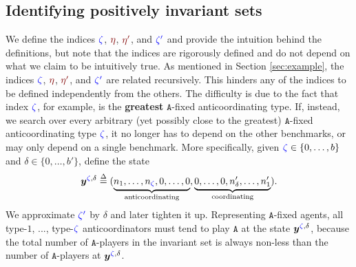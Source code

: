 \documentclass[10 pt,twocolumn,journal]{IEEEtran}
\theoremstyle{plain}
\newcommand{\db}{\overset{\Delta}{=}}
\newcommand{\A}{\mathcal{A}}
\renewcommand{\O}{\mathcal{O}}
\newcommand{\I}{\mathcal{I}}
\newcommand{\y}{\bm{y}}
\renewcommand{\r}{\tb{\zeta}}
\newcommand{\rr}{\tb{\zeta'}}
\newcommand{\s}{\tr{\eta}}
\renewcommand{\ss}{\tr{\eta'}}
\renewcommand{\d}{{\delta}}
\renewcommand{\A}{\mathtt{A}}
\newcommand{\tb}{\textcolor{blue}}
\newcommand{\tr}{\textcolor{Myred}}
\theoremstyle{definition}
\begin{document}
\subsection{Identifying positively invariant sets}  \label{identifyingPositivelyInvarianSets}
%
We define the indices $\r$, $\s$, $\ss$, and $\rr$ and provide the intuition behind the definitions, but note that the indices are rigorously defined and do not depend on what we claim to be intuitively true. %
As mentioned in Section \ref{sec:example}, the indices $\r$, $\s$, $\ss$, and $\rr$ are related recursively. 
This hinders any of the indices to be defined independently from the others.
The difficulty is due to the fact that index $\r$, for example, is the \textbf{greatest} $\A$-fixed anticoordinating type. 
If, instead, we search over every arbitrary (yet possibly close to the greatest) $\A$-fixed anticoordinating type $\r$, it no longer has to depend on the other benchmarks, or may only depend on a single benchmark. 
More specifically, given $\r\in\{0,\ldots,b\}$ and $\d\in\{0,\ldots,b'\}$, define the state
\begin{equation*}
    \y^{\r,\d} \db
    (\underbrace{n_1,\ldots,n_{\r},0,\ldots,0}_{\text{anticoordinating}}, 
    \underbrace{0,\ldots,0, n'_{\d}, \ldots, n'_{1}}_{\text{coordinating}}).
\end{equation*}
We approximate $\rr$ by $\delta$ and later tighten it up. 
Representing $\A$-fixed agents, all type-$1$, ..., type-$\r$ anticoordinators must tend to play $\A$ at the state $\y^{\r,\d}$, because the total number of $\A$-players in the invariant set is always non-less than the number of $\A$-players at $\y^{\r,\d}$.
\end{document}
